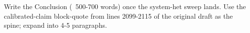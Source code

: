 \documentclass[11pt,a4paper]{report}  %
\newif\ifshowtodo
\newcommand{\TODOhpc}[1]{%
  \ifshowtodo\textcolor{red}{\textbf{[HPC PENDING: #1]}}\else#1\fi}
\begin{document}
%


\TODOhpc{Write the Conclusion (~500-700 words) once the system-het
sweep lands. Use the calibrated-claim block-quote from lines
2099-2115 of the original draft as the spine; expand into 4-5
paragraphs.}



\end{document}
